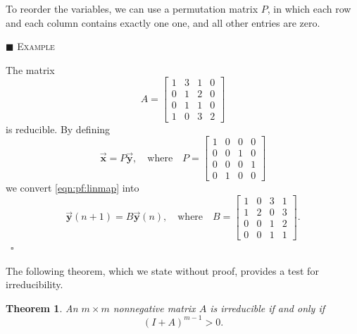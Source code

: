 \documentclass[reqno]{immbook}
\newcommand{\BX}{\vec{\textbf{x}}}
\newcommand{\BY}{\vec{\textbf{y}}}
\numberwithin{equation}{chapter}
\newtheorem{theorem}{Theorem}
\numberwithin{question}{section}
\numberwithin{theorem}{chapter}
\numberwithin{figure}{chapter}
\theoremstyle{definition}
\newenvironment{xexample}%
{%

\medskip\noindent\addtocounter{example}{1}$\blacksquare$ \textsc{Example \theexample}\hspace*{1em}%
}%
{%
~\hfill$\square$

\medskip
}
\begin{document}
To reorder the variables, we can use a permutation matrix
$P$, in which each row and each column contains exactly
one one, and all other entries are zero.
\begin{xexample}
The matrix 
\begin{equation}
  A = \begin{bmatrix}
            1 & 3 & 1 & 0 \\
            0 & 1 & 2 & 0 \\
            0 & 1 & 1 & 0 \\
            1 & 0 & 3 & 2
      \end{bmatrix}
\end{equation}
is reducible.  By defining
\begin{equation}
   \BX = P\BY, \quad \textrm{where}\quad
   P = \begin{bmatrix}
          1 & 0 & 0 & 0 \\
          0 & 0 & 1 & 0 \\
          0 & 0 & 0 & 1 \\
          0 & 1 & 0 & 0
       \end{bmatrix}
\end{equation}
we convert \eqref{eqn:pf:linmap} into
\begin{equation}
   \BY(n+1) = B\BY(n), \quad \textrm{where} \quad
   B = \begin{bmatrix}
         1 & 0 & 3 & 1 \\
         1 & 2 & 0 & 3 \\
         0 & 0 & 1 & 2 \\
         0 & 0 & 1 & 1
       \end{bmatrix}.
\end{equation}
\end{xexample}

The following theorem, which we state without proof, provides
a test for irreducibility.
\begin{theorem}
An $m\times m$ nonnegative matrix $A$ is 
irreducible if and only if
\begin{equation}
   (I+A)^{m-1} > 0.
\end{equation}
\end{theorem}
\end{document}

